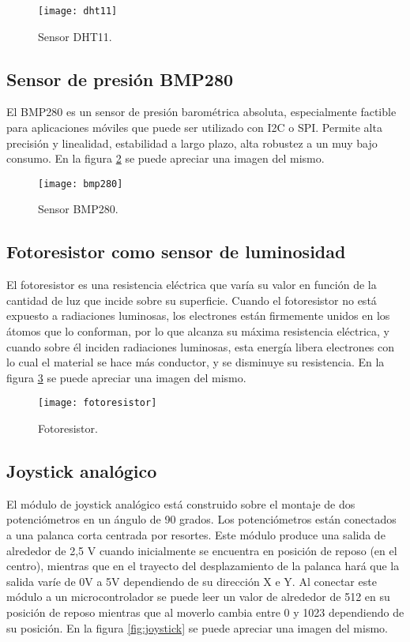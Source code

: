 \begin{figure}[h]
    \centering
    \texttt{[image: dht11]}
    \caption{Sensor DHT11.}
    \label{fig:dht11}
\end{figure}

\subsection{Sensor de presión BMP280}

El BMP280 es un sensor de presión barométrica absoluta, especialmente factible para aplicaciones móviles que puede ser utilizado con I2C o SPI. Permite alta precisión y linealidad, estabilidad a largo plazo, alta robustez a un muy bajo consumo. En la figura \ref{fig:bmp280} se puede apreciar una imagen del mismo.

\begin{figure}[h]
    \centering
    \texttt{[image: bmp280]}
    \caption{Sensor BMP280.}
    \label{fig:bmp280}
\end{figure}

\subsection{Fotoresistor como sensor de luminosidad}

El fotoresistor es una resistencia eléctrica que varía su valor en función de la cantidad de luz que incide sobre su superficie. 
Cuando el fotoresistor no está expuesto a radiaciones luminosas, los electrones están firmemente unidos en los átomos que lo conforman, por lo que alcanza su máxima resistencia eléctrica, y cuando sobre él inciden radiaciones luminosas, esta energía libera electrones con lo cual el material se hace más conductor, y se disminuye su resistencia. En la figura \ref{fig:fotoresistor} se puede apreciar una imagen del mismo.

\begin{figure}[h]
    \centering
    \texttt{[image: fotoresistor]}
    \caption{Fotoresistor.}
    \label{fig:fotoresistor}
\end{figure}

\subsection{Joystick analógico}

El módulo de joystick analógico está construido sobre el montaje de dos potenciómetros en un ángulo de 90 grados. Los potenciómetros están conectados a una palanca corta centrada por resortes. Este módulo produce una salida de alrededor de 2,5 V cuando inicialmente se encuentra en posición de reposo (en el centro), mientras que en el trayecto del desplazamiento de la palanca hará que la salida varíe de 0V a 5V
dependiendo de su dirección X e Y. Al conectar este módulo a un microcontrolador se puede leer un valor de alrededor de 512 en su posición de reposo mientras que al moverlo cambia entre 0 y 1023 dependiendo de su posición. En la figura \ref{fig:joystick} se puede apreciar una imagen del mismo.

